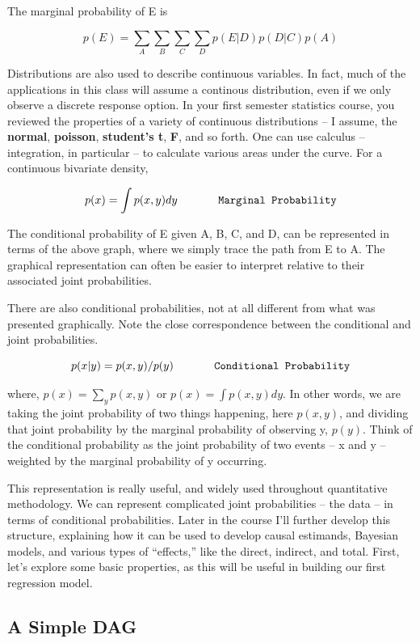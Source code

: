 \documentclass[
]{book}
\begin{document}
The marginal probability of E is

\[
p(E) = \sum_A \sum_B \sum_C \sum_D p(E|D)p(D|C)p(A)
\]

Distributions are also used to describe continuous variables. In fact, much of the applications in this class will assume a continous distribution, even if we only observe a discrete response option. In your first semester statistics course, you reviewed the properties of a variety of continuous distributions -- I assume, the \textbf{normal}, \textbf{poisson}, \textbf{student's t}, \textbf{F}, and so forth. One can use calculus -- integration, in particular -- to calculate various areas under the curve. For a continuous bivariate density,

\[p(x)=\int p(x, y) dy \hspace{0.5in}  \texttt{Marginal Probability}\]

The conditional probability of E given A, B, C, and D, can be represented in terms of the above graph, where we simply trace the path from E to A. The graphical representation can often be easier to interpret relative to their associated joint probabilities.

There are also conditional probabilities, not at all different from what was presented graphically. Note the close correspondence between the conditional and joint probabilities.

\[p(x|y)=p(x,y)/p(y)\hspace{0.5in} \texttt{Conditional Probability}\]

where, \(p(x)=\sum_y p(x, y)\) or \(p(x)=\int p(x, y) dy\). In other words, we are taking the joint probability of two things happening, here \(p(x,y)\), and dividing that joint probability by the marginal probability of observing y, \(p(y)\). Think of the conditional probability as the joint probability of two events -- x and y -- weighted by the marginal probability of y occurring.

This representation is really useful, and widely used throughout quantitative methodology. We can represent complicated joint probabilities -- the data -- in terms of conditional probabilities. Later in the course I'll further develop this structure, explaining how it can be used to develop causal estimands, Bayesian models, and various types of ``effects,'' like the direct, indirect, and total. First, let's explore some basic properties, as this will be useful in building our first regression model.

\subsection{A Simple DAG}\label{a-simple-dag}
\end{document}
